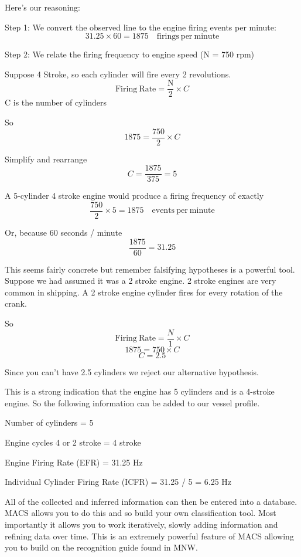 Here's our reasoning:

Step 1: We convert the observed line to the engine firing events per minute:
\[
    31.25 \times 60 = 1875 \quad \mathrm{firings\ per\ minute}
\]

Step 2: We relate the firing frequency to engine speed (N = 750 rpm)

Suppose 4 Stroke, so each cylinder will fire every 2 revolutions.
\[
\mathrm{Firing\ Rate} = \frac{\mathrm{N}}{2} \times C
\]
C is the number of cylinders

So
\[
1875 = \frac{750}{2} \times C
\]

Simplify and rearrange
\[
C = \frac{1875}{375} = 5
\]

A 5-cylinder 4 stroke engine would produce a firing frequency of exactly
\[
\frac{750}{2} \times 5 = 1875 \quad \mathrm{events\ per\ minute}
\]

Or, because 60 seconds / minute
\[
\frac{1875}{60} = 31.25
\]

This seems fairly concrete but remember falsifying hypotheses is a powerful tool. Suppose we had assumed it was a 2 stroke engine. 2 stroke engines are very common in shipping. A 2 stroke engine cylinder fires for every rotation of the crank.

So
\[
\mathrm{Firing\ Rate} = \frac{N}{1} \times C
\]
\[
1875 = 750 \times C
\]
\[
C = 2.5
\]

Since you can't have 2.5 cylinders we reject our alternative hypothesis.


This is a strong indication that the engine has 5 cylinders and is a 4-stroke engine. So the following information can be added to our vessel profile.

\begin{compactitem}
    \item Number of cylinders = 5
    \item Engine cycles 4 or 2 stroke = 4 stroke
    \item Engine Firing Rate (EFR) = 31.25 Hz
    \item Individual Cylinder Firing Rate (ICFR) = 31.25 / 5 = 6.25 Hz
\end{compactitem}

All of the collected and inferred information can then be entered into a database. MACS allows you to do this and so build your own classification tool. Most importantly it allows you to work iteratively, slowly adding information and refining data over time. This is an extremely powerful feature of MACS allowing you to build on the recognition guide found in MNW.

